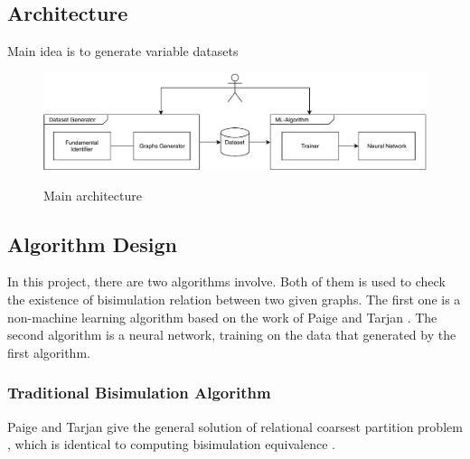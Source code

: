 \subsection{Architecture}
Main idea is to generate variable datasets

\begin{figure}[H]
\centering
\caption{Main architecture}
\includegraphics[width=\textwidth]{img/architecture.pdf}
\label{fig:global_performance}
\end{figure}



\subsection{Algorithm Design}
In this project, there are two algorithms involve. 
Both of them is used to check the existence of bisimulation relation between two given graphs.
The first one is a non-machine learning algorithm based on the work of Paige and Tarjan \cite{Paige1987}. 
The second algorithm is a neural network, training on the data that generated by the first algorithm.
\subsubsection{Traditional Bisimulation Algorithm}
Paige and Tarjan give the general solution of relational coarsest partition problem \cite{Paige1987}, which is identical to computing bisimulation equivalence \cite{Dovier2004}.
